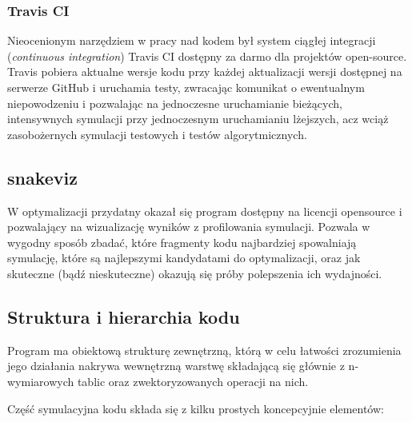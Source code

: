{    \subsubsection{Travis CI}
    Nieocenionym narzędziem w pracy nad kodem był system ciągłej integracji (\emph{continuous integration})
    Travis CI 
    dostępny za darmo dla projektów open-source. Travis pobiera aktualne wersje kodu przy każdej aktualizacji
    wersji dostępnej na serwerze GitHub i uruchamia testy, zwracając komunikat o ewentualnym niepowodzeniu i
    pozwalając na jednoczesne uruchamianie bieżących, intensywnych symulacji przy jednoczesnym uruchamianiu
    lżejszych, acz wciąż zasobożernych 
    symulacji testowych i testów algorytmicznych.

    \subsection{snakeviz}
    W optymalizacji przydatny okazał się program  dostępny na licencji opensource i pozwalający na
    wizualizację wyników z profilowania symulacji. Pozwala w wygodny sposób zbadać, które fragmenty kodu najbardziej
    spowalniają symulację, które są najlepszymi kandydatami do optymalizacji, oraz jak skuteczne (bądź nieskuteczne)
    okazują się próby polepszenia ich wydajności.

    \subsection{Struktura i hierarchia kodu}

    Program ma obiektową strukturę zewnętrzną, którą w celu łatwości zrozumienia jego działania nakrywa wewnętrzną warstwę
    składającą się głównie z n-wymiarowych tablic  oraz zwektoryzowanych operacji na nich.

    Część symulacyjna kodu składa się z kilku prostych koncepcyjnie elementów:

}
